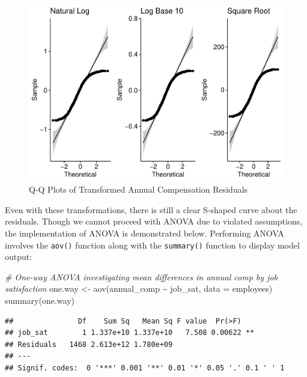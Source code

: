 \documentclass[
]{book}
\newenvironment{Shaded}{\begin{snugshade}}{\end{snugshade}}
\newcommand{\AttributeTok}[1]{\textcolor[rgb]{0.77,0.63,0.00}{#1}}
\newcommand{\CommentTok}[1]{\textcolor[rgb]{0.56,0.35,0.01}{\textit{#1}}}
\newcommand{\FunctionTok}[1]{\textcolor[rgb]{0.00,0.00,0.00}{#1}}
\newcommand{\NormalTok}[1]{#1}
\newcommand{\OtherTok}[1]{\textcolor[rgb]{0.56,0.35,0.01}{#1}}
\newcommand{\SpecialCharTok}[1]{\textcolor[rgb]{0.00,0.00,0.00}{#1}}
\begin{document}
\begin{figure}

{\centering \includegraphics{People_Analytics_Lifecycle_files/figure-latex/qq-plots-trans-1} 

}

\caption{Q-Q Plots of Transformed Annual Compensation Residuals}\label{fig:qq-plots-trans}
\end{figure}

Even with these transformations, there is still a clear S-shaped curve about the residuals. Though we cannot proceed with ANOVA due to violated assumptions, the implementation of ANOVA is demonstrated below. Performing ANOVA involves the \texttt{aov()} function along with the \texttt{summary()} function to display model output:

\begin{Shaded}
\begin{Highlighting}[]
\CommentTok{\# One{-}way ANOVA investigating mean differences in annual comp by job satisfaction}
\NormalTok{one.way }\OtherTok{\textless{}{-}} \FunctionTok{aov}\NormalTok{(annual\_comp }\SpecialCharTok{\textasciitilde{}}\NormalTok{ job\_sat, }\AttributeTok{data =}\NormalTok{ employees)}
\FunctionTok{summary}\NormalTok{(one.way)}
\end{Highlighting}
\end{Shaded}

\begin{verbatim}
##               Df    Sum Sq   Mean Sq F value  Pr(>F)   
## job_sat        1 1.337e+10 1.337e+10   7.508 0.00622 **
## Residuals   1468 2.613e+12 1.780e+09                   
## ---
## Signif. codes:  0 '***' 0.001 '**' 0.01 '*' 0.05 '.' 0.1 ' ' 1
\end{verbatim}
\end{document}
